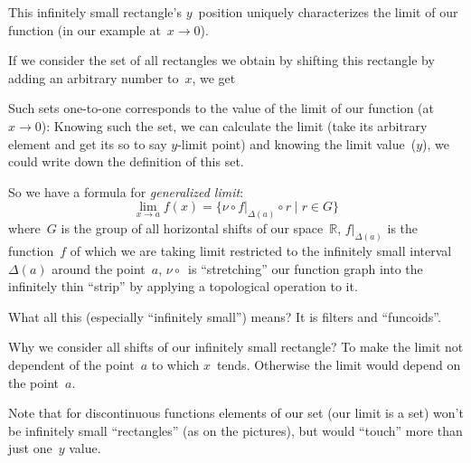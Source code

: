 \documentclass{amsart}
\begin{document}
This infinitely small rectangle's $y$~position uniquely characterizes the limit of our function (in our example at~$x\to 0$).

If we consider the set of all rectangles we obtain by shifting this rectangle by adding an arbitrary number to~$x$, we get
\begin{figure}[H]
\end{figure}
Such sets one-to-one corresponds to the value of the limit of our function (at $x\to 0$): Knowing such the set, we can calculate the limit (take its arbitrary element and get its so to say $y$-limit point) and knowing the limit value~($y$), we could write down the definition of this set.

So we have a formula for \emph{generalized limit}:
\[ \lim_{x\to a} f(x) =
\{ \nu \circ f|_{\Delta(a)} \circ r \mid r\in G \} \]
where~$G$ is the group of all horizontal shifts of our space~$\mathbb{R}$, $f|_{\Delta(a)}$ is the function~$f$ of which we are taking limit restricted to the infinitely small interval~$\Delta(a)$ around the point~$a$, $\nu\circ{}$~is ``stretching'' our function graph into the infinitely thin ``strip'' by applying a topological operation to it.

What all this (especially ``infinitely small'') means? It is filters and ``funcoids''.

Why we consider all shifts of our infinitely small rectangle? To make the limit not dependent of the point~$a$ to which $x$~tends. Otherwise the limit would depend on the point~$a$.

Note that for discontinuous functions elements of our set (our limit is a set) won't be infinitely small ``rectangles'' (as on the pictures), but would ``touch'' more than just one~$y$ value.
\end{document}
